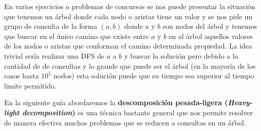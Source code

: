 En varios ejercicios o problemas de concursos se nos puede presentar la situación que tenemos un árbol donde cada nodo o aristas tiene un valor y se nos pide un grupo de consulta de la forma $(a,b)$ donde $a$ y $b$ son nodos del árbol y tenemos que buscar en el único camino que existe entre $a$ y $b$ en al árbol aquellos valores de los nodos o aristas que conforman el camino determinada propiedad. La idea trivial sería realizar una DFS de $a$ a $b$ y buscar la solución pero debido a la cantidad de de consultas y lo grande que puede ser el árbol (en la mayoría de los casos hasta $10^5$ nodos) esta solución puede que su tiempo sea superior al tiempo limite permitido.

En la siguiente guía abordaremos la \textbf{descomposición pesada-ligera (\emph{Heavy-light decomposition})} es una técnica bastante general que nos permite resolver de manera efectiva muchos problemas que se reducen a consultas en un árbol.